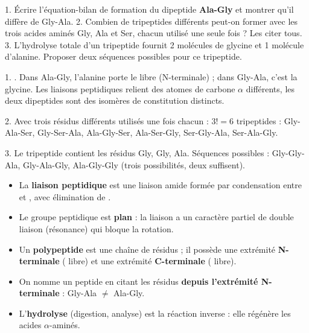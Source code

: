 \documentclass[11pt]{article}
\begin{document}
\begin{exercice}
1. Écrire l'équation-bilan de formation du dipeptide \textbf{Ala-Gly} et montrer qu'il diffère de Gly-Ala.
2. Combien de tripeptides différents peut-on former avec les trois acides aminés Gly, Ala et Ser, chacun utilisé une seule fois ? Les citer tous.
3. L'hydrolyse totale d'un tripeptide fournit 2 molécules de glycine et 1 molécule d'alanine. Proposer deux séquences possibles pour ce tripeptide.
\end{exercice}

\begin{corrige}[Exercice]
1. . Dans Ala-Gly, l'alanine porte le  libre (N-terminale) ; dans Gly-Ala, c'est la glycine. Les liaisons peptidiques relient des atomes de carbone $\alpha$ différents, les deux dipeptides sont des isomères de constitution distincts.

2. Avec trois résidus différents utilisés une fois chacun : $3! = 6$ tripeptides : Gly-Ala-Ser, Gly-Ser-Ala, Ala-Gly-Ser, Ala-Ser-Gly, Ser-Gly-Ala, Ser-Ala-Gly.

3. Le tripeptide contient les résidus Gly, Gly, Ala. Séquences possibles : Gly-Gly-Ala, Gly-Ala-Gly, Ala-Gly-Gly (trois possibilités, deux suffisent).
\end{corrige}

\begin{aretenir}
\begin{itemize}
\item La \textbf{liaison peptidique} est une liaison amide  formée par condensation entre  et , avec élimination de .
\item Le groupe peptidique est \textbf{plan} : la liaison  a un caractère partiel de double liaison (résonance) qui bloque la rotation.
\item Un \textbf{polypeptide} est une chaîne de résidus ; il possède une extrémité \textbf{N-terminale} ( libre) et une extrémité \textbf{C-terminale} ( libre).
\item On nomme un peptide en citant les résidus \textbf{depuis l'extrémité N-terminale} : Gly-Ala $\neq$ Ala-Gly.
\item L'\textbf{hydrolyse} (digestion, analyse) est la réaction inverse : elle régénère les acides $\alpha$-aminés.
\end{itemize}
\end{aretenir}
\end{document}
